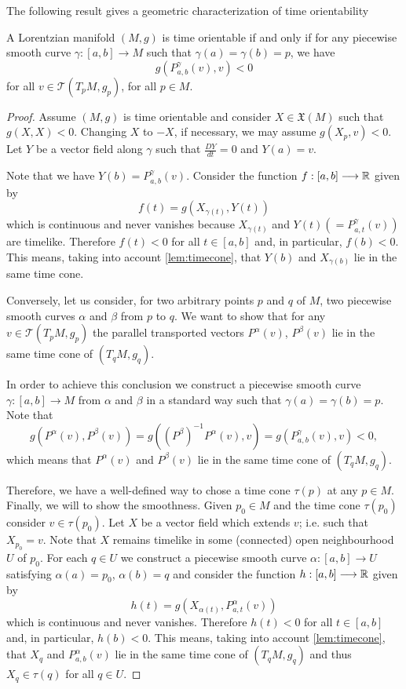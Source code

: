 The following result gives a geometric characterization of time orientability \cite[p. 255]{sachs77}

\begin{corollary}
	\label{parallel_transport}

    A Lorentzian manifold $(M,g)$ is time orientable if and only if for any piecewise smooth curve $\gamma : [a,b] \longrightarrow M$ such that $\gamma(a)=\gamma(b)=p$, we have
    \[
    g(P_{a,b}^{\gamma}(v),v)<0
    \]
    for all $v\in \mathcal{T}(T_pM,g_p)$, for all $p \in M$.

\end{corollary}

\begin{proof}
    Assume $(M,g)$ is time orientable and consider $X \in \mathfrak{X}(M)$ such that $g(X,X)<0$. Changing $X$ to $-X$, if necessary, we may assume $g(X_p,v)<0$. Let $Y$ be a vector field along $\gamma$ such that $\frac{DY}{dt}=0$ and $Y(a)=v$.

    Note that we have $Y(b)=P_{a,b}^{\gamma}(v)$. Consider the function $f : [a,b] \longrightarrow \mathbb{R}$ given by
    \[
        f(t)= g(X_{\gamma(t)},Y(t))
    \]
    which is continuous and never vanishes because $X_{\gamma(t)}$ and $Y(t)(=P_{a,t}^{\gamma}(v))$ are timelike. Therefore $f(t)<0$ for all $t\in [a,b]$ and, in particular, $f(b)<0$. This means, taking into account \autoref{lem:timecone}, that $Y(b)$ and $X_{\gamma(b)}$ lie in the same time cone.

    Conversely, let us consider, for two arbitrary points $p$ and $q$ of $M$, two piecewise smooth curves $\alpha$ and $\beta$ from $p$ to $q$. We want to show that for any $v\in \mathcal{T}(T_pM,g_p)$ the parallel transported vectors $P^{\alpha}(v)$, $P^{\beta}(v)$ lie in the same time cone of $(T_qM,g_q)$.

    In order to achieve this conclusion we construct a piecewise smooth curve $\gamma : [a,b] \longrightarrow M$ from $\alpha$ and $\beta$ in a standard way such that $\gamma(a)=\gamma(b)=p$. Note that $$g(P^{\alpha}(v),P^{\beta}(v))=g((P^{\beta})^{-1}P^{\alpha}(v),v)=g(P_{a,b}^{\gamma}(v),v)<0,$$ which means that $P^{\alpha}(v)$ and $P^{\beta}(v)$ lie in the same time cone of $(T_qM,g_q)$.

    Therefore, we have a well-defined way to chose a time cone $\tau(p)$ at any $p \in M$. Finally, we will to show the smoothness. Given $p_0 \in M$ and the time cone $\tau(p_0)$ consider $v \in \tau(p_0)$. Let $X$ be a vector field which extends $v$; i.e. such that $X_{p_{0}}=v$. Note that $X$ remains timelike in some (connected) open neighbourhood $U$ of $p_0$. For each $q \in U$ we construct a piecewise smooth curve $\alpha : [a,b] \longrightarrow U$ satisfying $\alpha(a)=p_0$,
    $\alpha(b)=q$ and consider the function $h : [a,b] \longrightarrow \mathbb{R}$ given by
    \[
        h(t)=g(X_{\alpha(t)},P_{a,t}^{\alpha}(v))
    \]
    which is continuous and never vanishes. Therefore $h(t)<0$ for all $t\in [a,b]$ and, in particular, $h(b)<0$. This means, taking into account \autoref{lem:timecone}, that $X_q$ and $P_{a,b}^{\alpha}(v)$ lie in the same time cone of $(T_qM,g_q)$ and thus $X_q \in \tau(q)$ for all $q \in U$.
\end{proof}

